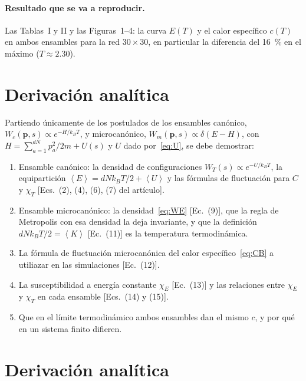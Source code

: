 \documentclass[11pt,letterpaper]{article}
\newcommand{\avg}[1]{\left\langle #1 \right\rangle}
\newcommand{\kB}{k_{B}}
\begin{document}
\paragraph{Resultado que se va a reproducir.}
Las Tablas~I y II y las Figuras~1--4: la curva $E(T)$ y el calor específico $c(T)$
en ambos ensambles para la red $30\times30$, en particular la diferencia del
16~\% en el máximo ($T\approx2.30$).

\section{Derivación analítica}

Partiendo únicamente de los postulados de los ensambles canónico,
$W_c(\bm p,s)\propto e^{-H/\kB T}$, y microcanónico, $W_m(\bm p,s)\propto\delta(E-H)$,
con $H=\sum_{a=1}^{dN}p_a^2/2m+U(s)$ y $U$ dado por~\eqref{eq:U}, se debe demostrar:
\begin{enumerate}[label=(\alph*),itemsep=1pt]
\item Ensamble canónico: la densidad de configuraciones $W_T(s)\propto e^{-U/\kB T}$,
la equipartición $\avg E=dN\kB T/2+\avg U$ y las fórmulas de fluctuación para $C$
y $\chi_T$ [Ecs.~(2), (4), (6), (7) del artículo].
\item Ensamble microcanónico: la densidad~\eqref{eq:WE} [Ec.~(9)], que la regla de
Metropolis con esa densidad la deja invariante, y que la definición
$dN\kB T/2=\avg K$ [Ec.~(11)] es la temperatura termodinámica.
\item La fórmula de fluctuación microcanónica del calor
específico~\eqref{eq:CB} a utiliazar en las simulaciones [Ec.~(12)].
\item La susceptibilidad a energía constante $\chi_E$ [Ec.~(13)] y las relaciones
entre $\chi_E$ y $\chi_T$ en cada ensamble [Ecs.~(14) y (15)].
\item Que en el límite termodinámico ambos ensambles dan el mismo $c$, y por qué en
un sistema finito difieren.
\end{enumerate}

\section{Derivación analítica}
\end{document}
